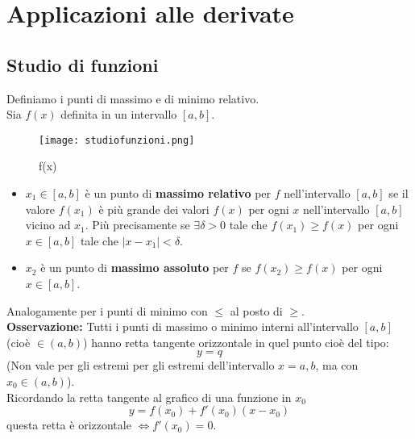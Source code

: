 \documentclass[../../main.tex]{subfiles}
\begin{document}
\section{Applicazioni alle derivate}
\subsection{Studio di funzioni}
Definiamo i punti di massimo e di minimo relativo.\\
Sia $f(x)$ definita in un intervallo $[a, b]$.
\begin{center}
    \begin{figure}[h!]
        \texttt{[image: studiofunzioni.png]}
        \caption{f(x)}
        \label{fig:studiofunzioni}
    \end{figure}
\end{center}

\begin{itemize}
    \item $x_1\in[a, b]$ è un punto di \textbf{massimo relativo} per $f$ nell'intervallo $[a, b]$ se il valore $f(x_1)$ è più grande dei valori
          $f(x)$ per ogni $x$ nell'intervallo $[a, b]$ vicino ad $x_1$. Più precisamente se $\exists \delta > 0$
          tale che $f(x_1) \geq f(x)$ per ogni $x\in[a, b]$ tale che $|x-x_1|<\delta$.
    \item $x_2$ è un punto di \textbf{massimo assoluto} per $f$ se $f(x_2)\geq f(x)$ per ogni $x\in[a, b]$.
\end{itemize}
Analogamente per i punti di minimo con $\leq$ al posto di $\geq$.\\
\textbf{Osservazione:} Tutti i punti di massimo o minimo interni all'intervallo $[a, b]$ (cioè $\in(a, b)$) hanno retta tangente orizzontale in quel punto cioè del tipo:
\[
    y = q
\]
(Non vale per gli estremi per gli estremi dell'intervallo $x=a,b$, ma con $x_0\in(a, b)$).\\
Ricordando la retta tangente al grafico di una funzione in $x_0$
\[
    y = f(x_0) + f'(x_0)(x-x_0)
\]
questa retta è orizzontale $\iff f'(x_0) = 0$.\\
\end{document}
